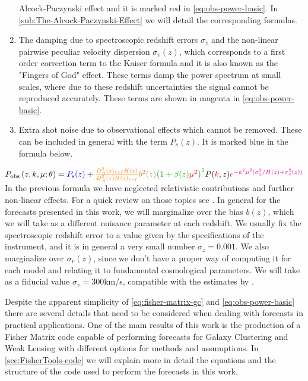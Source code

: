 \begin{enumerate}
Alcock-Paczynski effect \citep{alcock1979anevolution, ballinger_measuring_1996, feldman_power_1994} and it is marked red in \cref{eq:obs-power-basic}.
In \cref{sub:The-Alcock-Paczynski-Effect} we will detail the corresponding formulas.
\item The damping due to spectroscopic redshift errors $\sigma_{z}$ and the non-linear pairwise peculiar
velocity dispersion $\sigma_{v}(z)$, which corresponds to a first order correction
term to the Kaiser formula and it is also known as the "Fingers of God" effect. These terms damp the power spectrum at small scales, where due to these redshift
uncertainties the signal cannot be reproduced accurately. These terms are shown in magenta in \cref{eq:obs-power-basic}. 
\item Extra shot noise due to observational effects which cannot be removed. These can be included
in general with the term $P_{s}(z)$. It is marked blue in the formula below.
\end{enumerate}
\beeq$\label{eq:obs-power-basic}
P_{{\rm obs}}\left(z,k,\mu;\theta\right)=\textcolor{blue}{P_{{\rm s}}(z)}+{\color{orange}\frac{D_{A}^{2}(z)_{ref}H(z)}{D_{A}^{2}(z)H(z)_{ref}}}
{\color{brown}b^{2}(z)}
{\color{green}\left(1+\beta(z){\color{red}\mu}^{{\color{red}2}}\right)^{2}}P({\color{red}k},z){\color{magenta}e^{-k^{2}\mu^{2}(\sigma_{z}^{2}/H(z)+\sigma_{v}^{2}(z))}}
$
In the previous formula we have neglected relativistic contributions and further non-linear effects.
For a quick review on those topics see .
In general for the forecasts presented in this work,
we will marginalize over the bias $b(z)$, which we will take as a different nuisance parameter at each redshift. We usually fix
the spectroscopic redshift error  to a value given by the specifications of the instrument, and it is in general a very small number
$\sigma_{z}=0.001$. We also marginalize over $\sigma_{v}(z)$, 
since we don't have a proper way of computing it for each model and relating it to fundamental cosmological parameters.
We will take as a fiducial value $\sigma_{v} = 300$km/s, compatible with the estimates by \cite{de_la_torre_modelling_2012}.

Despite the apparent 
simplicity of \cref{eq:fisher-matrix-gc} and \cref{eq:obs-power-basic} there
are several details that need to be considered when dealing with forecasts
in practical applications. 
One of the main results of this work is the production of a Fisher Matrix code capable of performing
forecasts for Galaxy Clustering and Weak Lensing with different options for methods and assumptions.
In \cref{sec:FisherTools-code} we will explain more in detail the equations and the structure of the code
used to perform the forecasts in this work.



